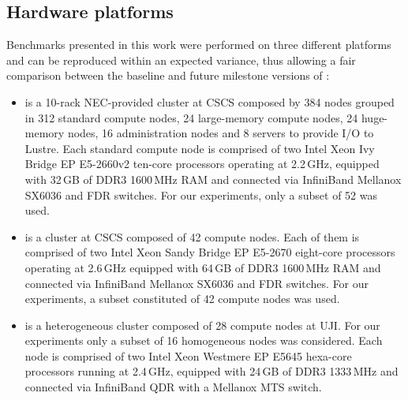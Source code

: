 \subsection{Hardware platforms}
\label{subsec:3.1}

Benchmarks presented  in this work  were performed on  three different
platforms  and can  be reproduced  within an  expected  variance, thus
allowing a  fair comparison between the baseline  and future milestone
versions of \cosmoart:

\begin{itemize}
\item \monch is  a 10-rack NEC-provided clus\-ter at  CSCS composed by
  384   nodes  grouped  in  312  standard  compute  nodes,  24
  large-memory compute nodes,  24 huge-memory nodes, 16 administration
  nodes and 8 servers to provide I/O to Lustre.
Each standard  compute node  is comprised of  two Intel Xeon Ivy Bridge EP
E5-2660v2  ten-core processors  operating at  2.2\,GHz,  equipped with
32\,GB  of DDR3 1600\,MHz  RAM and  connected via  InfiniBand Mellanox
SX6036 and FDR switches.  For our experiments, only a subset of 52 was used. %

\item \pilat is a cluster at CSCS composed of 42 compute nodes.  
  Each of them is comprised of two Intel Xeon Sandy Bridge EP E5-2670 eight-core processors operating
  at 2.6\,GHz equipped with 64\,GB of DDR3 1600\,MHz RAM and connected
  via  InfiniBand   Mellanox  SX6036   and  FDR  switches.    For  our
  experiments, a subset constituted of 42 compute  nodes was used.

\item \tinto is  a heterogeneous cluster composed of  28 compute nodes
  at UJI.  For our experiments only  a subset of  16 homogeneous nodes
  was  considered. Each  node  is  comprised of  two  Intel Xeon Westmere EP E5645
  hexa-core processors  running at  2.4\,GHz, equipped with  24\,GB of
  DDR3  1333\,MHz and  connected via  InfiniBand QDR  with  a Mellanox
  MTS switch. 
\end{itemize}

